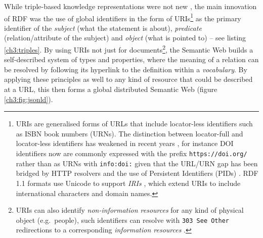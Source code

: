 While triple-based knowledge representations were not new \cite{Stanczyk 1987}, the main innovation of RDF was the use of global identifiers in the form of URIs\footnote{URIs \cite{Berners-Lee 2005} are generalised forms of URLs that include locator-less identifiers such as ISBN book numbers (URNs). The distinction between locator-full and locator-less identifiers has weakened in recent years \cite{OCLC 2010}, for instance DOI identifiers now are commonly expressed with the prefix \texttt{https://doi.org/} rather than as URNs with \texttt{info:doi:} given that the URL/URN gap has been bridged by HTTP resolvers and the use of Persistent Identifiers (PIDs) \cite{Juty 2011}. RDF 1.1 formats use Unicode to support \emph{IRIs} \cite{Dürst 2005}, which extend URIs to include international characters and domain names.} as the primary identifier of the \emph{subject} (what the statement is about), \emph{predicate} (relation/attribute of the subject) and \emph{object} (what is pointed to) -- see listing \vref{ch3:triples}. By using URIs not just for documents\footnote{URIs can also identify \emph{non-information resources} for any kind of physical object (e.g.~people), such identifiers can resolve with \texttt{303\ See\ Other} redirections to a corresponding \emph{information resources} \cite{Sauermann 2008}.}, the Semantic Web builds a self-described system of types and properties, where the meaning of a relation can be resolved by following its hyperlink to the definition within a \emph{vocabulary}. By applying these principles as well to any kind of resource that could be described at a URL, this then forms a global distributed Semantic Web (figure \vref{ch3:fig:jsonld}).


